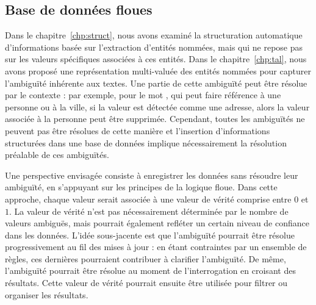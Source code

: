 \subsection{Base de données floues}

Dans le chapitre~\ref{chp:struct}, nous avons examiné la structuration automatique d'informations basée sur l'extraction d'entités nommées, mais qui ne repose pas sur les valeurs spécifiques associées à ces entités.
Dans le chapitre~\ref{chp:tal}, nous avons proposé une représentation multi-valuée des entités nommées pour capturer l'ambiguïté inhérente aux textes.
Une partie de cette ambiguïté peut être résolue par le contexte : par exemple, pour le mot , qui peut faire référence à une personne ou à la ville, si la valeur est détectée comme une adresse, alors la valeur associée à la personne peut être supprimée.
Cependant, toutes les ambiguïtés ne peuvent pas être résolues de cette manière et l'insertion d'informations structurées dans une base de données implique nécessairement la résolution préalable de ces ambiguïtés.

Une perspective envisagée consiste à enregistrer les données sans résoudre leur ambiguïté, en s'appuyant sur les principes de la logique floue.
Dans cette approche, chaque valeur serait associée à une valeur de vérité comprise entre $0$ et $1$.
La valeur de vérité n'est pas nécessairement déterminée par le nombre de valeurs ambiguës, mais pourrait également refléter un certain niveau de confiance dans les données.
L'idée sous-jacente est que l'ambiguïté pourrait être résolue progressivement au fil des mises à jour : en étant contraintes par un ensemble de règles, ces dernières pourraient contribuer à clarifier l'ambiguïté.
De même, l'ambiguïté pourrait être résolue au moment de l'interrogation en croisant des résultats.
Cette valeur de vérité pourrait ensuite être utilisée pour filtrer ou organiser les résultats.

